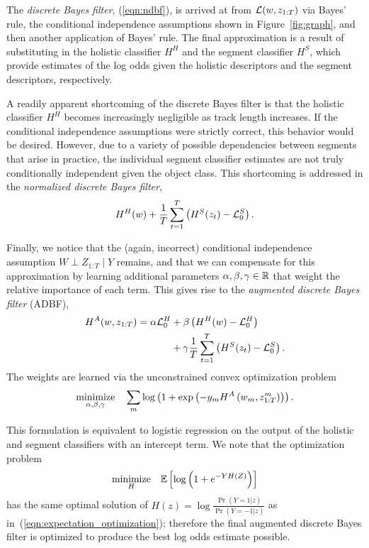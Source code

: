 \documentclass[letterpaper, 10 pt, conference]{ieeeconf}  %
\newcommand{\logodds}[1]{\log \frac{\Pr(Y = 1 | #1)}{\Pr(Y = -1 | #1)}}
\newcommand{\zT}{z_{1:T}}
\begin{document}
The \textit{\naive discrete Bayes filter}, (\ref{eqn:ndbf}), is arrived at from $\L(w, \zT)$ via Bayes' rule, the conditional independence assumptions shown in Figure~\ref{fig:graph}, and then another application of Bayes' rule.  The final approximation is a result of substituting in the holistic classifier $H^H$ and the segment classifier $H^S$, which provide estimates of the log odds given the holistic descriptors and the segment descriptors, respectively.

A readily apparent shortcoming of the \naive discrete Bayes filter is that the holistic classifier $H^H$ becomes increasingly negligible as track length increases. If the conditional independence assumptions were strictly correct, this behavior would be desired.  However, due to a variety of possible dependencies between segments that arise in practice, the individual segment classifier estimates are not truly conditionally independent given the object class. This shortcoming is addressed in the \textit{normalized discrete Bayes filter},
\begin{align*}
  H^H(w) + \frac{1}{T}\sum_{t=1}^T \left( H^S(z_t) - \mathcal{L}_0^S \right).
\end{align*}

Finally, we notice that the (again, incorrect) conditional independence assumption $W \perp Z_{1:T} \; | \; Y$ remains, and that we can compensate for this approximation by learning additional parameters $\alpha, \beta, \gamma \in \mathbb{R}$ that weight the relative importance of each term.  This gives rise to the \textit{augmented discrete Bayes filter} (ADBF), 
\begin{align}
  H^A(w, \zT) = \alpha \L_0^H & + \beta \left( H^H(w) - \L_0^H \right) \notag \\
  & + \gamma \frac{1}{T}\sum_{t=1}^T \left( H^S(z_t) - \L_0^S \right). \label{eqn:adbf}
\end{align}
The weights are learned via the unconstrained convex optimization problem
\begin{align}
  \minimize{\alpha, \beta, \gamma} \sum_m \log \left( 1 + \exp \left(-y_m H^A \left( w_m, \zT^m \right) \right) \right). \label{eqn:adbf_opt}
\end{align}

This formulation is equivalent to logistic regression on the output of the holistic and segment classifiers with an intercept term.  We note that the optimization problem
\begin{align*}
  \underset{H}{\mbox{minimize}}\quad \mathbb{E} \left[ \log \left( 1 + e^{-YH(Z)} \right) \right]
\end{align*}
has the same optimal solution of $H(z) = \logodds{z}$ as in~(\ref{eqn:expectation_optimization}); therefore the final augmented discrete Bayes filter is optimized to produce the best log odds estimate possible.
\end{document}
